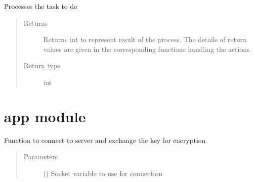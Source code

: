 \documentclass[letterpaper,10pt,english]{sphinxmanual}
\begin{document}
\begin{fulllineitems}
\begin{fulllineitems}
\end{fulllineitems}


\begin{fulllineitems}
\label{\detokenize{Message:Message.Message.processTask}}
Processes the task to do
\begin{quote}\begin{description}
\item[{Returns}] \leavevmode
Returns int to represent result of the process. The details of return values are given in the corresponding functions handling the actions.

\item[{Return type}] \leavevmode
int

\end{description}\end{quote}

\end{fulllineitems}


\end{fulllineitems}



\section{app module}
\label{\detokenize{app:module-app}}\label{\detokenize{app:app-module}}\label{\detokenize{app::doc}}

\begin{fulllineitems}
\label{\detokenize{app:app.connectToServer}}
Function to connect to server and exchange the key for encryption
\begin{quote}\begin{description}
\item[{Parameters}] \leavevmode
{} () \textendash{} Socket variable to use for connection

\end{description}\end{quote}

\end{fulllineitems}
\end{document}
